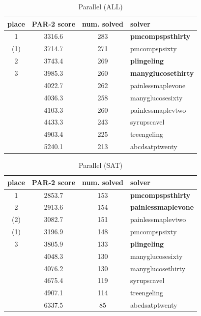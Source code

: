 \documentclass{elsarticle}
\begin{document}
\begin{table}
\caption{Parallel (ALL)}
\label{tab:parallelALL}
\begin{tabular}{cccl}
place & PAR-2 score & num. solved & solver \\
\hline
 1 & 3316.6 & 283 & {\bf pmcompspsthirty} \\
(1)& 3714.7 & 271 & pmcompspsixty \\
 2 & 3743.4 & 269 & {\bf plingeling} \\
 3 & 3985.3 & 260 & {\bf manyglucosethirty} \\
   & 4022.7 & 262 & painlessmaplevone \\
   & 4036.3 & 258 & manyglucosesixty \\
   & 4103.3 & 260 & painlessmaplevtwo \\
   & 4433.3 & 243 & syrupscavel \\
   & 4903.4 & 225 & treengeling \\
   & 5240.1 & 213 & abcdsatptwenty \\
\end{tabular}
\end{table}

\begin{table}
\caption{Parallel (SAT)}
\label{tab:parallelSAT}
\begin{tabular}{cccl}
place & PAR-2 score & num. solved & solver \\
\hline
 1 & 2853.7 & 153 & {\bf pmcompspsthirty} \\
 2 & 2913.6 & 154 & {\bf painlessmaplevone} \\
(2)& 3082.7 & 151 & painlessmaplevtwo \\
(1)& 3196.9 & 148 & pmcompspsixty \\
 3 & 3805.9 & 133 & {\bf plingeling} \\
   & 4048.3 & 130 & manyglucosesixty \\
   & 4076.2 & 130 & manyglucosethirty \\
   & 4675.4 & 119 & syrupscavel \\
   & 4907.1 & 114 & treengeling \\
   & 6337.5 & \phantom{0}85 & abcdsatptwenty \\
\end{tabular}
\end{table}
\end{document}
